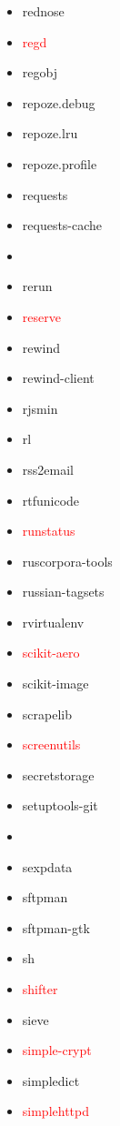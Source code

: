 \documentclass{l4proj}
\begin{document}
\begin{appendices}
{\begin{itemize}
\item rednose
\item\textcolor{red}{regd}
\item regobj
\end{itemize}
}%
\clearpage
\noindent\parbox[t]{0.32\textwidth}{\raggedright%
\begin{itemize}
\item repoze.debug
\item repoze.lru
\item repoze.profile
\item requests
\item requests-cache
\item\textcolor{red}{}
\item rerun
\item\textcolor{red}{reserve}
\item rewind
\item rewind-client
\item rjsmin
\item rl
\item rss2email
\item rtfunicode
\item\textcolor{red}{runstatus}
\item ruscorpora-tools
\item russian-tagsets
\item rvirtualenv
\item\textcolor{red}{scikit-aero}
\item scikit-image
\item scrapelib
\item\textcolor{red}{screenutils}
\item secretstorage
\item setuptools-git
\item {}
\item sexpdata
\item sftpman
\end{itemize}
}%
\noindent\parbox[t]{0.32\textwidth}{\raggedright%
\begin{itemize}
\item sftpman-gtk
\item sh
\item\textcolor{red}{shifter}
\item sieve
\item\textcolor{red}{simple-crypt}
\item simpledict
\item\textcolor{red}{simplehttpd}

\end{itemize}}
\end{appendices}
\end{document}
